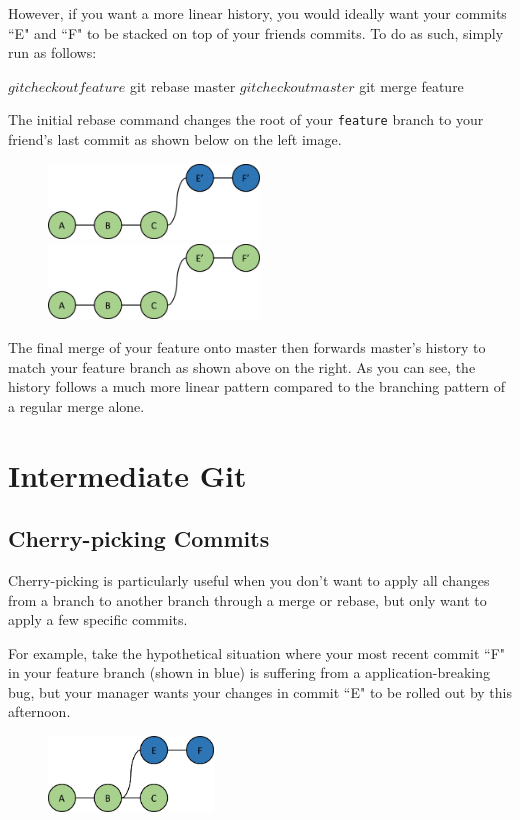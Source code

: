 \documentclass[12pt]{report}
\begin{document}
However, if you want a more linear history, you would ideally want your commits ``E" and ``F" to be stacked on top of your friends commits.  To do as such, simply run as follows:
\begin{blockcode}
$ git checkout feature
$ git rebase master
$ git checkout master
$ git merge feature
\end{blockcode}

The initial rebase command changes the root of your \texttt{feature} branch to your friend's last commit as shown below on the left image.

\begin{figure}[h]
\center
\includegraphics[height=2cm]{rebase}
\includegraphics[height=2cm]{rebase_merge}
\end{figure}

The final merge of your feature onto master then forwards master's history to match your feature branch as shown above on the right.  As you can see, the history follows a much more linear pattern compared to the branching pattern of a regular merge alone.

\chapter{Intermediate Git}
\section{Cherry-picking Commits}

Cherry-picking is particularly useful when you don't want to apply all changes from a branch to another branch through a merge or rebase, but only want to apply a few specific commits.

For example, take the hypothetical situation where your most recent commit ``F" in your feature branch (shown in blue) is suffering from a application-breaking bug, but your manager wants your changes in commit ``E" to be rolled out by this afternoon.

\begin{figure}[h]
\center
\includegraphics[height=2cm]{feature}
\end{figure}
\end{document}
